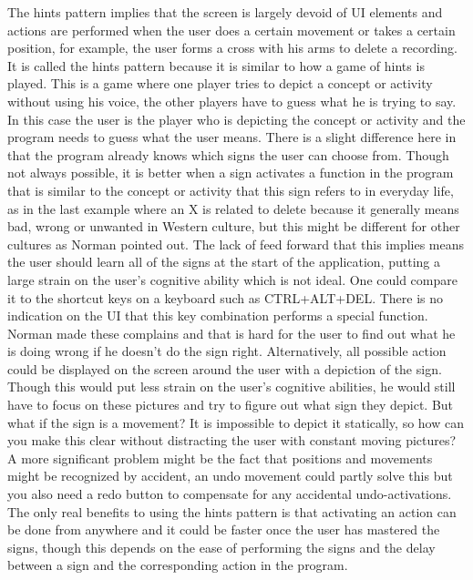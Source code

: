 The hints pattern implies that the screen is largely devoid of UI elements and actions are performed when the user does a certain movement or takes a certain position, for example, the user forms a cross with his arms to delete a recording. It is called the hints pattern because it is similar to how a game of hints is played. This is a game where one player tries to depict a concept or activity without using his voice, the other players have to guess what he is trying to say. In this case the user is the player who is depicting the concept or activity and the program needs to guess what the user means. There is a slight difference here in that the program already knows which signs the user can choose from. Though not always possible, it is better when a sign activates a function in the program that is similar to the concept or activity that this sign refers to in everyday life, as in the last example where an X is related to delete because it generally means bad, wrong or unwanted in Western culture, but this might be different for other cultures as Norman \cite{Norman2010} pointed out. The lack of feed forward that this implies means the user should learn all of the signs at the start of the application, putting a large strain on the user's cognitive ability which is not ideal. One could compare it to the shortcut keys on a keyboard such as CTRL+ALT+DEL. There is no indication on the UI that this key combination performs a special function. Norman \cite{Norman2010} made these complains and that is hard for the user to find out what he is doing wrong if he doesn't do the sign right. Alternatively, all possible action could be displayed on the screen around the user with a depiction of the sign. Though this would put less strain on the user's cognitive abilities, he would still have to focus on these pictures and try to figure out what sign they depict. But what if the sign is a movement? It is impossible to depict it statically, so how can you make this clear without distracting the user with constant moving pictures? A more significant problem might be the fact that positions and movements might be recognized by accident, an undo movement could partly solve this but you also need a redo button to compensate for any accidental undo-activations. The only real benefits to using the hints pattern is that activating an action can be done from anywhere and it could be faster once the user has mastered the signs, though this depends on the ease of performing the signs and the delay between a sign and the corresponding action in the program.\\

